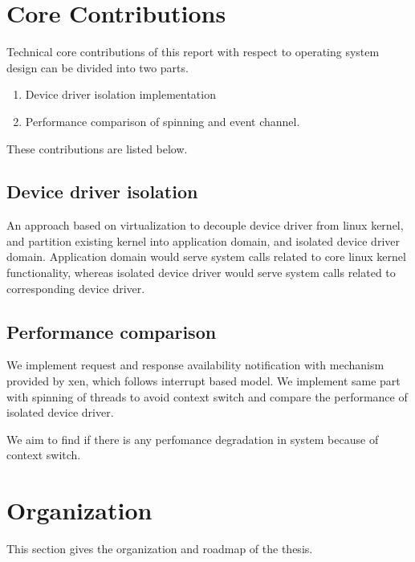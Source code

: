 \pagebreak

\section{Core Contributions}

Technical core contributions of this report with respect to operating system design can be divided into two parts. 
\begin{enumerate}
\item Device driver isolation implementation 
\item Performance comparison of spinning and event channel.
\end{enumerate}

These contributions are listed below. 

\subsection{Device driver isolation}

An approach based on virtualization to decouple device driver from linux kernel, and partition existing kernel into application domain, and isolated device driver domain. Application domain would serve system calls related to core linux kernel functionality, whereas isolated device driver would serve system calls related to corresponding device driver.

\subsection{Performance comparison}

We implement request and response availability notification with mechanism provided by xen, which follows interrupt based model. We implement same part with spinning of threads to avoid context switch and compare the performance of isolated device driver.

We aim to find if there is any perfomance degradation in system because of context switch.

\pagebreak
\section {Organization}

This section gives the organization and roadmap of the thesis.


